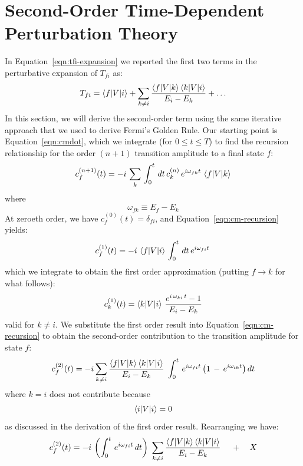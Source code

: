 \documentclass[12pt]{article}
\begin{document}
\section{Second-Order Time-Dependent Perturbation Theory}
In Equation~\ref{eqn:tfi-expansion} we reported the first two terms in
the perturbative expansion of $T_{fi}$ as:
\begin{equation}
\label{eqn:result-second-order}
T_{fi} = \braket{f|V|i} + \sum_{k \neq i} \frac{\braket{f|V|k}\braket{k|V|i}}{E_i-E_k} + \ldots
\end{equation}
In this section, we will derive the second-order term using the same
iterative approach that we used to derive Fermi's Golden Rule.
Our starting point is Equation~\ref{eqn:cmdot}, which we integrate
(for $0 \leq t \leq T$) to find the recursion relationship for the
order $(n+1)$ transition amplitude to a final state $f$:
\begin{equation}
\label{eqn:cm-recursion}
c_f^{(n+1)}(t)  = -i  \, \sum_{k} \, \int_0^t \, dt \, c_k^{(n)} \, e^{ i \omega_{fk} t }
\, \braket{f | V | k}
\end{equation}
where
$$\omega_{fk} \equiv E_f - E_k$$
At zeroeth order, we have $c_f^{(0)}(t) = \delta_{fi}$, and
Equation~\ref{eqn:cm-recursion} yields:
\begin{equation*}
c_f^{(1)}(t)  = -i  \, \braket{f | V | i} \, \int_0^t \, dt \, e^{ i \omega_{fi} t } \,
\end{equation*}
which we integrate to obtain the first order approximation (putting $f \to k$ for what follows):
$$c_k^{(1)}(t) = \braket{k|V|i} \, \frac{e^{i \, \omega_{ki} \, t} - 1}{E_i-E_k}$$
valid for $k \neq i$.  We substitute
the first order result into Equation~\ref{eqn:cm-recursion} to obtain the second-order contribution to the transition amplitude for state $f$:
\begin{align*}
c_f^{(2)}(t) &= -i \sum_{k \neq i} \frac{\braket{f | V | k}
  \braket{k | V | i}}{E_i - E_k} \; \int_0^t \, e^{ i \omega_{fi} t} \left(  1 \, - \,  e^{ i \omega_{ik} t} \right) dt \\
\end{align*}
where $k=i$ does not contribute because
$$\braket{i | V | i} = 0$$ as discussed in the derivation of the first
order result.  Rearranging we have:
\begin{align*}
  c_f^{(2)}(t)  &= -i \, \left( \int_0^t \, e^{ i \omega_{fi} t} \, dt \right) \;
  \sum_{k \neq i} \frac{\braket{f | V | k}
  \braket{k | V | i}}{E_i - E_k} \;  \quad + \quad X \\
\end{align*}
\end{document}
